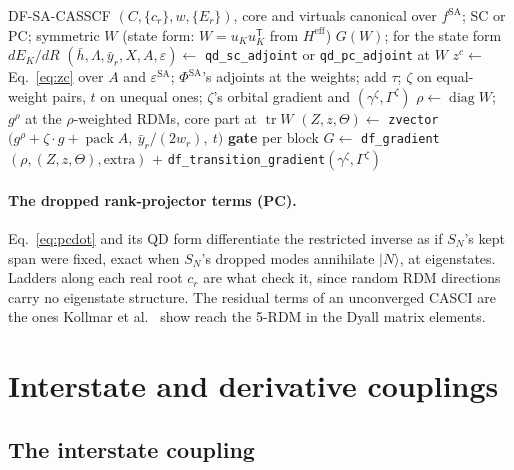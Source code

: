 \documentclass[11pt]{article}
\newcommand{\code}[1]{\texttt{#1}}
\newcommand{\eps}{\varepsilon}
\newcommand{\Heff}{H^{\mathrm{eff}}}
\newcommand{\hb}{\bar h}
\newcommand{\Lb}{\Lambda}
\newcommand{\T}{\mathsf T}
\newcommand{\tr}{\operatorname{tr}}
\begin{document}
\begin{algorithm}[htbp]
\caption{The DF-QD-NEVPT2 gradient $G(W)$ (\code{qd\_lagrangians} and \code{qd\_passes})}
\label{alg:qdgrad}
\begin{algorithmic}[1]
\Require DF-SA-CASSCF $(C, \{c_r\}, w, \{E_r\})$, core and virtuals canonical over $f^{\mathrm{SA}}$; SC or PC; symmetric $W$ (state form: $W = u_Ku_K^\T$ from $\Heff$)
\Ensure $G(W)$; for the state form $dE_K/dR$
\State $(\hb, \Lb, \bar y_r, X, A, \eps) \gets$ \code{qd\_sc\_adjoint} or \code{qd\_pc\_adjoint} at $W$
\State $z^c \gets$ Eq.~\eqref{eq:zc} over $A$ and $\eps^{\mathrm{SA}}$; $\Phi^{\mathrm{SA}}$'s adjoints at the weights; add
\State $\tau$; $\zeta$ on equal-weight pairs, $t$ on unequal ones; $\zeta$'s orbital gradient and $(\gamma^\zeta, \Gamma^\zeta)$
\State $\rho \gets \operatorname{diag}W$; $g^\rho$ at the $\rho$-weighted RDMs, core part at $\tr W$
\State $(Z, z, \Theta) \gets$ \code{zvector}$\bigl(g^\rho + \zeta\cdot g + \operatorname{pack}A,\ \bar y_r/(2w_r),\ t\bigr)$
\State \textbf{gate} per block
\State $G \gets$ \code{df\_gradient}$(\rho, (Z,z,\Theta), \text{extra})$ $+$ \code{df\_transition\_gradient}$(\gamma^\zeta, \Gamma^\zeta)$
\end{algorithmic}
\end{algorithm}

\paragraph{The dropped rank-projector terms (PC).} Eq.~\eqref{eq:pcdot} and
its QD form differentiate the restricted inverse as if $S_N$'s kept span
were fixed, exact when $S_N$'s dropped modes annihilate $|N\rangle$, at
eigenstates. Ladders along each real root $c_r$ are what check it, since
random RDM directions carry no eigenstate structure. The residual terms of
an unconverged CASCI are the ones Kollmar et al.\ \cite{kollmar2021} show
reach the 5-RDM in the Dyall matrix elements.

\section{Interstate and derivative couplings}
\label{sec:nac}

\subsection{The interstate coupling}
\end{document}
